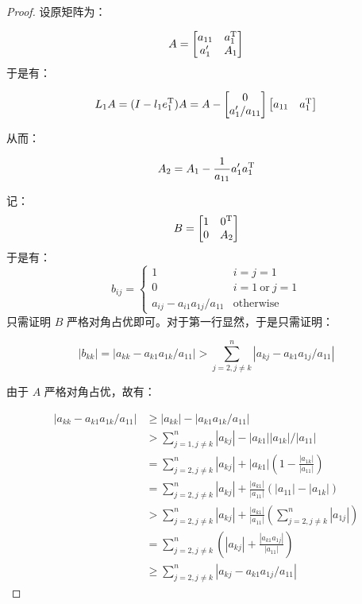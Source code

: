 \documentclass{article}
\begin{document}
\begin{proof}
  设原矩阵为：

  \[
    A =
    \begin{bmatrix}
      a_{11} & a_1^{\mathrm{T}} \\
      a'_1 & A_1
    \end{bmatrix}
  \]
  于是有：

  \[
    L_1 A = (I - l_1 e_1^{\mathrm{T}}) A
    = A - \begin{bmatrix} 0 \\ a'_1/a_{11} \end{bmatrix} \begin{bmatrix} a_{11} & a_1^{\mathrm{T}} \end{bmatrix}
  \]

  从而：

  \[
    A_2 = A_1 - \frac{1}{a_{11}} a'_1 a_1^{\mathrm{T}}
  \]

  记：
  \[
    B =
    \begin{bmatrix}
      1 & 0^{\mathrm{T}} \\
      0 & A_2 \\
    \end{bmatrix}
  \]
  于是有：
  \[
    b_{ij} =
    \begin{cases}
      1 & i = j = 1 \\
      0 & i = 1 \ \text{or}\ j = 1 \\
      a_{ij} - a_{i1} a_{1j} / a_{11} & \text{otherwise}
    \end{cases}
  \]
  只需证明 $B$ 严格对角占优即可。对于第一行显然，于是只需证明：

  \[
    |b_{kk}| = |a_{kk} - a_{k1}a_{1k} / a_{11}| > \sum_{j=2, j\neq k}^{n} |a_{kj} - a_{k1}a_{1j} / a_{11}|
  \]

  由于 $A$ 严格对角占优，故有：

  \[
    \begin{aligned}
      |a_{kk} - a_{k1}a_{1k} / a_{11}|
      &\geq |a_{kk}| - |a_{k1}a_{1k} / a_{11}| \\
      &> \sum_{j=1, j\neq k}^{n} |a_{kj}| - |a_{k1}||a_{1k}| / |a_{11}| \\
      &= \sum_{j=2, j\neq k}^{n} |a_{kj}| + |a_{k1}| (1 - \frac{|a_{1k}|}{|a_{11}|}) \\
      &= \sum_{j=2, j\neq k}^{n} |a_{kj}| + \frac{|a_{k1}|}{|a_{11}|} (|a_{11}| - |a_{1k}|) \\
      &> \sum_{j=2, j\neq k}^{n} |a_{kj}| + \frac{|a_{k1}|}{|a_{11}|} (\sum_{j=2, j\neq k}^{n} |a_{1j}|) \\
      &= \sum_{j=2, j\neq k}^{n} (|a_{kj}| + \frac{|a_{k1}a_{1j}|}{|a_{11}|}) \\
      &\geq \sum_{j=2, j\neq k}^{n} |a_{kj} - a_{k1}a_{1j} / a_{11}|
    \end{aligned}
  \]

\end{proof}
\end{document}
